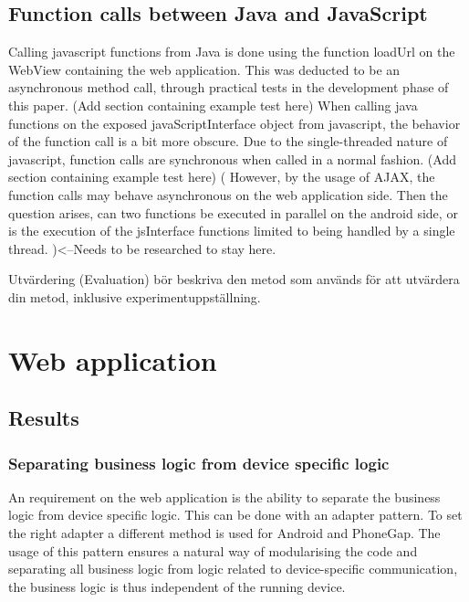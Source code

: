 \documentclass{./tex/cslthse-msc}
\begin{document}
\subsection {Function calls between Java and JavaScript}
Calling javascript functions from Java is done using the function loadUrl on the WebView containing the web application. This was deducted to be an asynchronous method call, through practical tests in the development phase of this paper. 
\newline\newline
(Add section containing example test here)
\newline\newline
When calling java functions on the exposed javaScriptInterface object from javascript, the behavior of the function call is a bit more obscure. Due to the single-threaded nature of javascript, function calls are synchronous when called in a normal fashion.
\newline\newline
(Add section containing example test here)
\newline\newline
( However, by the usage of AJAX, the function calls may behave asynchronous on the web application side. Then the question arises, can two functions be executed in parallel on the android side, or is the execution of the jsInterface functions limited to being handled by a single thread. )<--Needs to be researched to stay here.

Utvärdering (Evaluation) bör beskriva den metod som används för att utvärdera din metod, inklusive experimentuppställning.
\section{Web application} 
\subsection{Results}
\subsubsection{Separating business logic from device specific logic}
An requirement on the web application is the ability to separate the business logic from device specific logic. This can be done with an adapter pattern. To set the right adapter a different method is used for Android and PhoneGap. The usage of this pattern ensures a natural way of modularising the code and separating all business logic from logic related to device-specific communication, the business logic is thus independent of the running device. 
\end{document}
